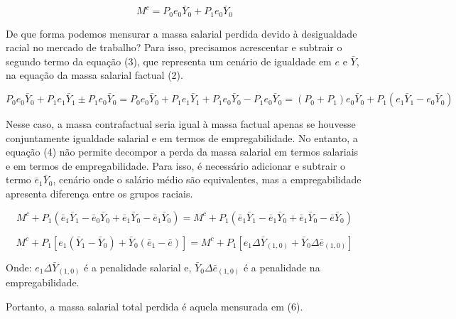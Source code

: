 \documentclass{article}
\begin{document}
	\begin{equation}
	M^{c} = P_{0}e_{0}\bar{Y}_{0} + P_{1}e_{0}\bar{Y}_{0}
	\end{equation}
	
	De que forma podemos mensurar a massa salarial perdida devido à desigualdade racial no mercado de trabalho? Para isso, precisamos acrescentar e subtrair o segundo termo da equação (3), que representa um cenário de igualdade em $e$ e $\bar{Y}$, na equação da massa salarial factual (2).
	
	\begin{equation}
	 P_{0}e_{0}\bar{Y}_{0} + P_{1}e_{1}\bar{Y}_{1} \pm P_{1}e_{0}\bar{Y}_{0} =  P_{0}e_{0}\bar{Y}_{0} + P_{1}e_{1}\bar{Y}_{1} + P_{1}e_{0}\bar{Y}_{0} - P_{1}e_{0}\bar{Y}_{0} = (P_{0} +  P_{1})e_{0}\bar{Y}_{0}  + P_{1}(e_{1}\bar{Y}_{1} - e_{0}\bar{Y}_{0})
	\end{equation} 
	
	Nesse caso, a massa contrafactual seria igual à massa factual apenas se houvesse conjuntamente igualdade salarial e em termos de empregabilidade. No entanto, a equação (4) não permite decompor a perda da massa salarial em termos salariais e em termos de empregabilidade. Para isso, é necessário adicionar e subtrair o termo $\bar{e}_{1}\bar{Y}_{0}$, cenário onde o salário médio são equivalentes, mas a empregabilidade apresenta diferença entre os grupos raciais. \newline
	
	\begin{equation}
		M^{c} + P_{1}(\bar{e}_{1}\bar{Y}_{1} - \bar{e}_{0}\bar{Y}_{0} + \bar{e}_{1}\bar{Y}_{0} - \bar{e}_{1}\bar{Y}_{0}) = M^{c} + P_{1}(\bar{e}_{1}\bar{Y}_{1} - \bar{e}_{1}\bar{Y}_{0} + \bar{e}_{1}\bar{Y}_{0} - \bar{e}\bar{Y}_{0})
	\end{equation}
	
	\begin{equation}
		M^{c} + P_{1}[e_{1}(\bar{Y}_{1} - \bar{Y}_{0}) + \bar{Y}_{0}(\bar{e}_{1} - \bar{e} )] =  M^{c} + P_{1}[e_{1}\Delta \bar{Y}_{(1,0)} + \bar{Y}_{0}\Delta \bar{e}_{(1,0)}]
	\end{equation}


	
	Onde: $e_{1}\Delta \bar{Y}_{(1,0)}$ é a penalidade salarial e, \newline
	$\bar{Y}_{0}\Delta \bar{e}_{(1,0)}$ é a penalidade na empregabilidade. \newline
	
	Portanto, a massa salarial total perdida é aquela mensurada em (6). \newline
	
\end{document}
